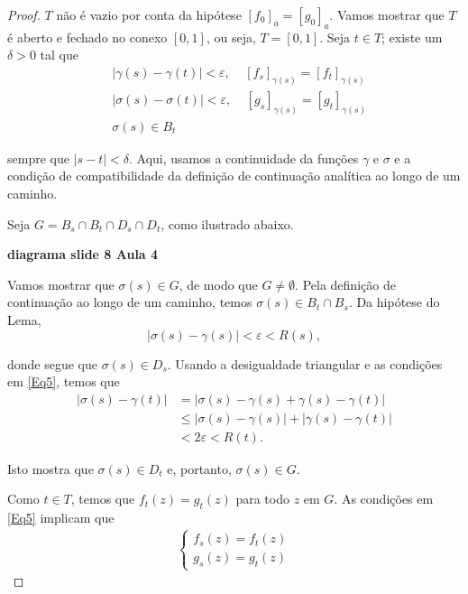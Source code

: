 \begin{proof}
$T$ não é vazio por conta da hipótese $[f_0]_a = [g_0]_a$. Vamos mostrar que $T$ é 
aberto e fechado no conexo $[0,1]$, ou seja, $T = [0,1]$. Seja $t \in T$; 
existe um $\delta > 0$ tal que
\begin{align}
\label{Eq5}
    &|\gamma(s) - \gamma(t)| < \varepsilon, \ \ \ \ \ [f_s]_{\gamma(s)} =
    [f_t]_{\gamma(s)} \\
    &|\sigma(s) - \sigma(t)| < \varepsilon, \ \ \ \ \ [g_s]_{\gamma(s)} =
    [g_t]_{\gamma(s)} \\
    &\sigma(s) \in B_t
\end{align}

sempre que $|s-t|<\delta$. Aqui, usamos a continuidade da funções $\gamma$ e $\sigma$ 
e a condição de compatibilidade da definição de continuação analítica ao longo de um
caminho.

Seja $G = B_s \cap B_t \cap D_s \cap D_t$, como ilustrado abaixo. 

\begin{center}
    \textbf{diagrama slide 8 Aula 4}
\end{center}

Vamos mostrar que 
$\sigma(s) \in G$, de modo que $G \neq \emptyset$. Pela definição de continuação 
ao longo de um caminho, temos $\sigma(s) \in B_t \cap B_s$. Da hipótese do Lema,
\begin{equation*}
|\sigma(s) - \gamma(s)| < \varepsilon < R(s),
\end{equation*}

donde segue que $\sigma(s) \in D_s$. Usando a desigualdade triangular e as condições em \ref{Eq5}, temos que 
\begin{align*}
|\sigma(s) - \gamma(t)| &= |\sigma(s) - \gamma(s) + \gamma(s) - \gamma(t)| \\
&\leq |\sigma(s) - \gamma(s)| + |\gamma(s) - \gamma(t)| \\
&< 2\varepsilon < R(t).
\end{align*}

Isto mostra que $\sigma(s) \in D_t$ e, portanto, $\sigma(s) \in G$.

Como $t \in T$, temos que $f_t(z) = g_t(z)$ para todo $z$ em $G$. 
As condições em \ref{Eq5} implicam que 
\begin{align*}
    \begin{cases}
    f_s(z) = f_t(z) \\
    g_s(z) = g_t(z)
    \end{cases}
\end{align*}


\end{proof}
